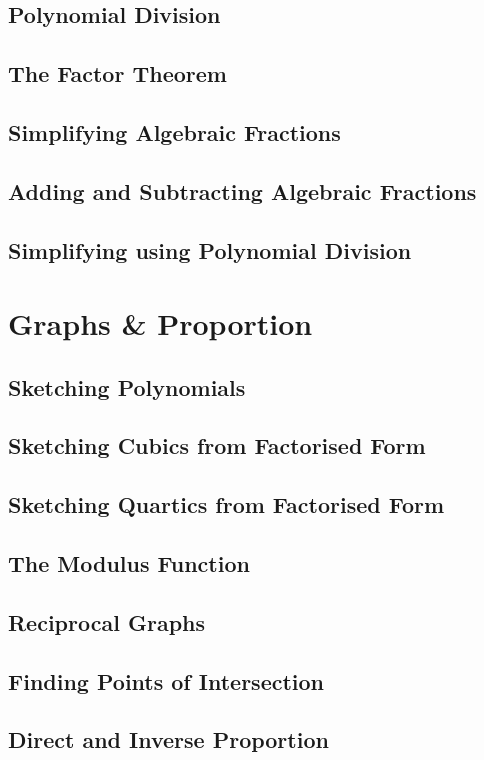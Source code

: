 \documentclass[../maths.tex]{subfiles}
\begin{document}
\subsection*{Polynomial Division}
\subsection*{The Factor Theorem}
\subsection*{Simplifying Algebraic Fractions}
\subsection*{Adding and Subtracting Algebraic Fractions}
\subsection*{Simplifying using Polynomial Division}
\section{Graphs \& Proportion}
\subsection*{Sketching Polynomials}
\subsection*{Sketching Cubics from Factorised Form}
\subsection*{Sketching Quartics from Factorised Form}
\subsection*{The Modulus Function}
\subsection*{Reciprocal Graphs}
\subsection*{Finding Points of Intersection}
\subsection*{Direct and Inverse Proportion}
\end{document}
